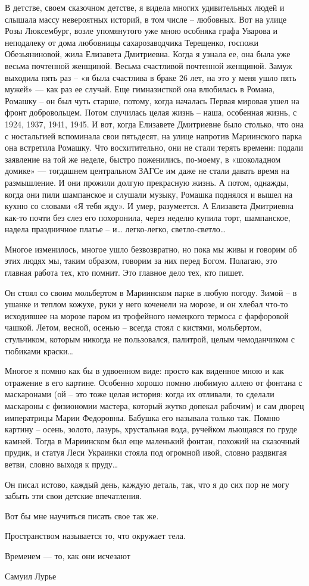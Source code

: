 В детстве, своем сказочном детстве, я видела многих удивительных людей и
слышала массу невероятных историй, в том числе – любовных. Вот на улице Розы
Люксембург, возле упомянутого уже мною особняка графа Уварова и неподалеку от
дома любовницы сахарозаводчика Терещенко, госпожи Обезьяниновой, жила Елизавета
Дмитриевна. Когда я узнала ее, она была уже весьма почтенной женщиной. Весьма
счастливой почтенной женщиной. Замуж выходила пять раз – «я была счастлива в
браке 26 лет, на это у меня ушло пять мужей» — как раз ее случай. Еще
гимназисткой она влюбилась в Романа, Ромашку – он был чуть старше, потому,
когда началась Первая мировая ушел на фронт добровольцем. Потом случилась целая
жизнь – наша, особенная жизнь, с 1924, 1937, 1941, 1945. И вот, когда Елизавете
Дмитриевне было столько, что она с ностальгией вспоминала свои пятьдесят, на
улице напротив Мариинского парка она встретила Ромашку. Что восхитительно, они
не стали терять времени: подали заявление на той же неделе, быстро поженились,
по-моему, в «шоколадном домике» — тогдашнем центральном ЗАГСе им даже не стали
давать время на размышление. И они прожили долгую прекрасную жизнь. А потом,
однажды, когда они пили шампанское и слушали музыку, Ромашка поднялся и вышел
на кухню со словами «Я тебя жду». И умер, разумеется. А Елизавета Дмитриевна
как-то почти без слез его похоронила, через неделю купила торт, шампанское,
надела праздничное платье – и… легко-легко, светло-светло…

Многое изменилось, многое ушло безвозвратно, но пока мы живы и говорим об этих
людях мы, таким образом, говорим за них перед Богом. Полагаю, это главная
работа тех, кто помнит. Это главное дело тех, кто пишет.

Он стоял со своим мольбертом в Мариинском парке в любую погоду. Зимой – в
ушанке и теплом кожухе, руки у него коченели на морозе, и он хлебал что-то
исходившее на морозе паром из трофейного немецкого термоса с фарфоровой чашкой.
Летом, весной, осенью – всегда стоял с кистями, мольбертом, стульчиком, которым
никогда не пользовался, палитрой, целым чемоданчиком с тюбиками краски…

Многое я помню как бы в удвоенном виде: просто как виденное мною и как
отражение в его картине. Особенно хорошо помню любимую аллею от фонтана с
маскаронами (ой – это тоже целая история: когда их отливали, то сделали
маскароны с физиономии мастера, который жутко допекал рабочим) и сам дворец
императрицы Марии Федоровны. Бабушка его называла только так. Помню картину –
осень, золото, лазурь, хрустальная вода, ручейком льющаяся по груде камней.
Тогда в Мариинском был еще маленький фонтан, похожий на сказочный прудик, и
статуя Леси Украинки стояла под огромной ивой, словно раздвигая ветви, словно
выходя к пруду…

Он писал истово, каждый день, каждую деталь, так, что я до сих пор не могу
забыть эти свои детские впечатления.

Вот бы мне научиться писать свое так же.

Пространством называется то, что окружает тела.

Временем — то, как они исчезают

Самуил Лурье
